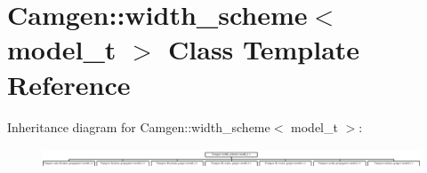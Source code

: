 \hypertarget{a00598}{}\section{Camgen\+:\+:width\+\_\+scheme$<$ model\+\_\+t $>$ Class Template Reference}
\label{a00598}
Inheritance diagram for Camgen\+:\+:width\+\_\+scheme$<$ model\+\_\+t $>$\+:\begin{figure}[H]
\begin{center}
\leavevmode
\includegraphics[height=0.577617cm]{a00598}
\end{center}
\end{figure}
